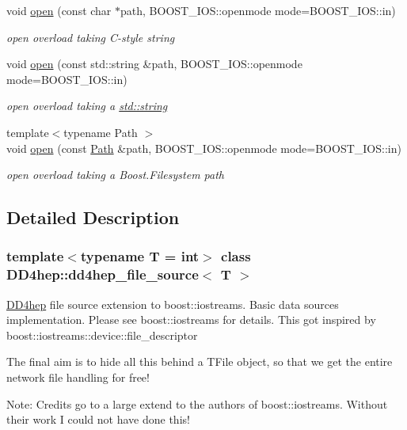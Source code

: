 \begin{DoxyCompactItemize}
void \hyperlink{class_d_d4hep_1_1dd4hep__file__source_ac9d66c792e2fa69fa7c9df98d8d45850}{open} (const char $\ast$path, BOOST\_\-IOS::openmode mode=BOOST\_\-IOS::in)
\begin{DoxyCompactList}\small\item\em open overload taking C-\/style string \item\end{DoxyCompactList}\item 
void \hyperlink{class_d_d4hep_1_1dd4hep__file__source_aae3ce079b4789a40e59a56e2496e6b8b}{open} (const std::string \&path, BOOST\_\-IOS::openmode mode=BOOST\_\-IOS::in)
\begin{DoxyCompactList}\small\item\em open overload taking a \hyperlink{classstd_1_1string}{std::string} \item\end{DoxyCompactList}\item 
{\footnotesize template$<$typename Path $>$ }\\void \hyperlink{class_d_d4hep_1_1dd4hep__file__source_aa001edf36ee67613428927464405bc29}{open} (const \hyperlink{class_d_d4hep_1_1_path}{Path} \&path, BOOST\_\-IOS::openmode mode=BOOST\_\-IOS::in)
\begin{DoxyCompactList}\small\item\em open overload taking a Boost.Filesystem path \item\end{DoxyCompactList}\end{DoxyCompactItemize}


\subsection{Detailed Description}
\subsubsection*{template$<$typename T = int$>$ class DD4hep::dd4hep\_\-file\_\-source$<$ T $>$}

\hyperlink{namespace_d_d4hep}{DD4hep} file source extension to boost::iostreams. Basic data sources implementation. Please see boost::iostreams for details. This got inspired by boost::iostreams::device::file\_\-descriptor

The final aim is to hide all this behind a TFile object, so that we get the entire network file handling for free!

Note: Credits go to a large extend to the authors of boost::iostreams. Without their work I could not have done this!

